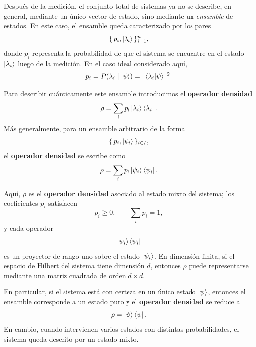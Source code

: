\documentclass[12pt,a4paper]{article}
\theoremstyle{definition}
\theoremstyle{plain}
\theoremstyle{remark}
\begin{document}
Después de la medición, el conjunto total de sistemas ya no se describe, en general, mediante un único vector de estado, sino mediante un \emph{ensamble} de estados. En este caso, el ensamble queda caracterizado por los pares
\begin{equation*}
    \{\,p_i,\ket{\lambda_i}\,\}_{i=1}^n,
\end{equation*}
donde $p_i$ representa la probabilidad de que el sistema se encuentre en el estado $\ket{\lambda_i}$ luego de la medición. En el caso ideal considerado aquí,
\begin{equation*}
    p_i = P(\lambda_i \mid \ket{\psi}) = |\braket{\lambda_i|\psi}|^2.
\end{equation*}

Para describir cuánticamente este ensamble introducimos el \textbf{operador densidad}
\begin{equation*}
    \rho = \sum_i p_i \ket{\lambda_i}\bra{\lambda_i}.
\end{equation*}
Más generalmente, para un ensamble arbitrario de la forma
\begin{equation*}
    \{\,p_i,\ket{\psi_i}\,\}_{i\in I},
\end{equation*}
el \textbf{operador densidad} se escribe como
\begin{equation*}
    \rho = \sum_i p_i \ket{\psi_i}\bra{\psi_i}.
\end{equation*}

Aquí, $\rho$ es el \textbf{operador densidad} asociado al estado mixto del sistema; los coeficientes $p_i$ satisfacen
\begin{equation*}
    p_i \ge 0,
    \qquad
    \sum_i p_i = 1,
\end{equation*}
y cada operador
\begin{equation*}
    \ket{\psi_i}\bra{\psi_i}
\end{equation*}
es un proyector de rango uno sobre el estado $\ket{\psi_i}$. En dimensión finita, si el espacio de Hilbert del sistema tiene dimensión $d$, entonces $\rho$ puede representarse mediante una matriz cuadrada de orden $d\times d$.

En particular, si el sistema está con certeza en un único estado $\ket{\psi}$, entonces el ensamble corresponde a un estado puro y el \textbf{operador densidad} se reduce a
\begin{equation*}
    \rho = \ket{\psi}\bra{\psi}.
\end{equation*}
En cambio, cuando intervienen varios estados con distintas probabilidades, el sistema queda descrito por un estado mixto. 
\end{document}
